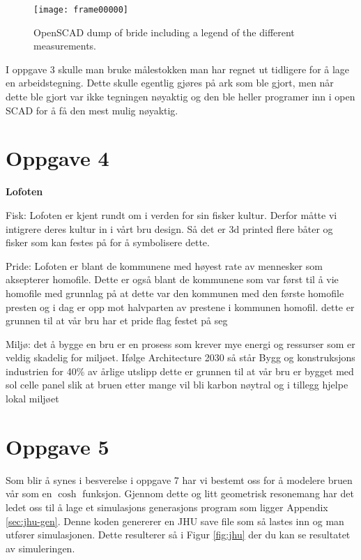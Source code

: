 \documentclass{report}
\begin{document}
\begin{figure}[H]
	\centering
	\texttt{[image: frame00000]}

	\caption {OpenSCAD dump of bride including a legend of the different measurements.}
	\label{fig:bridge}
\end{figure}

I oppgave 3 skulle man bruke målestokken man har regnet ut tidligere for å lage en arbeidstegning. Dette skulle egentlig gjøres på ark som ble gjort, men når dette ble gjort var ikke tegningen nøyaktig og den ble heller programer inn i open SCAD for å få den mest mulig nøyaktig.

\section{Oppgave 4}

\textbf {Lofoten}

Fisk: Lofoten er kjent rundt om i verden for sin fisker kultur. Derfor måtte vi intigrere deres kultur in i vårt bru design. Så det er 3d printed flere båter og fisker som kan festes på for å symbolisere dette.

Pride: Lofoten er blant de kommunene med høyest rate av mennesker som aksepterer homofile. Dette er også blant de kommunene som var først til å vie homofile med grunnlag på at dette var den kommunen med den første homofile presten og i dag er opp mot halvparten av prestene i kommunen homofil. dette er grunnen til at vår bru har et pride flag festet på seg

Miljø: det å bygge en bru er en prosess som krever mye energi og ressurser som er veldig skadelig for miljøet. Ifølge Architecture 2030 så står Bygg og konstruksjons industrien for 40\% av årlige utslipp dette er grunnen til at vår bru er bygget med sol celle panel slik at bruen etter mange vil bli karbon nøytral og i tillegg hjelpe lokal miljøet

\section{Oppgave 5}

Som blir å synes i besverelse i oppgave 7 har vi bestemt oss for å modelere bruen vår som en $\cosh$ funksjon. Gjennom dette og litt geometrisk resonemang har det ledet oss til å lage et simulasjons generasjons program som ligger Appendix \ref{sec:jhu-gen}. Denne koden genererer en JHU save file som så lastes inn og man utfører simulasjonen. Dette resulterer så i Figur \ref{fig:jhu} der du kan se resultatet av simuleringen.
\end{document}
